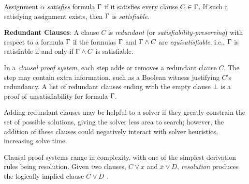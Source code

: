 Assignment $\alpha$ \emph{satisfies} formula $\Gamma$ if it satisfies every
clause $C \in \Gamma$. If such a satisfying assignment exists, then $\Gamma$
is \emph{satisfiable}.

\textbf{Redundant Clauses}: A clause $C$ is \emph{redundant} (or
\emph{satisfiability-preserving}) with respect to a formula $\Gamma$ if the
formulas $\Gamma$ and $\Gamma \land C$ are \emph{equisatisfiable}, i.e.,
$\Gamma$ is satisfiable if and only if $\Gamma \land C$ is satisfiable.

In a \emph{clausal proof system}, each step adds or removes a redundant clause
$C$. The step may contain extra information, such as a Boolean witness
justifying $C$'s redundancy. A list of redundant clauses ending with the empty
clause $\bot$ is a proof of unsatisfiability for formula $\Gamma$.


Adding redundant clauses may be helpful to a solver if they greatly constrain
the set of possible solutions, giving the solver less area to search; however,
the addition of these clauses could negatively interact with solver heuristics,
increasing solve time.


Clausal proof systems range in complexity, with one of the simplest derivation
rules being resolution. Given two clauses, $C \lor x$ and $\overline{x} \lor D$,
\emph{resolution} produces the logically implied clause  $C \lor D$ .

